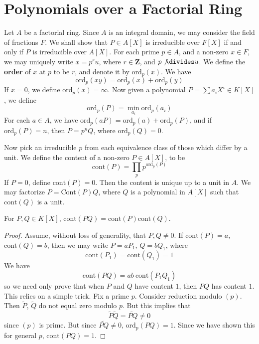 \section{Polynomials over a Factorial Ring}

Let $A$ be a factorial ring. Since $A$ is an integral domain, we may consider the field of fractions $F$. We shall show that $P \in A[X]$ is irreducible over $F[X]$ if and only if $P$ is irreducible over $A[X]$. For each prime $p \in A$, and a non-zero $x \in F$, we may uniquely write $x = p^r u$, where $r \in \mathbf{Z}$, and $p \not \divides u$. We define the {\bf order} of $x$ at $p$ to be $r$, and denote it by $\text{ord}_p(x)$. We have
%
\[ \text{ord}_p(xy) = \text{ord}_p(x) + \text{ord}_p(y) \]
%
If $x = 0$, we define $\text{ord}_p(x) = \infty$. Now given a polynomial $P = \sum a_i X^i \in K[X]$, we define
%
\[ \text{ord}_p(P) = \min_{a_i} \text{ord}_p(a_i) \]
%
For each $a \in A$, we have $\text{ord}_p(aP) = \text{ord}_p(a) + \text{ord}_p(P)$, and if $\text{ord}_p(P) = n$, then $P = p^n Q$, where $\text{ord}_p(Q) = 0$.

Now pick an irreducible $p$ from each equivalence class of those which differ by a unit. We define the content of a non-zero $P \in A[X]$, to be
%
\[ \text{cont}(P) = \prod_p p^{\text{ord}_p(P)} \]
%
If $P = 0$, define $\text{cont}(P) = 0$. Then the content is unique up to a unit in $A$. We may factorize $P = \text{Cont}(P)Q$, where $Q$ is a polynomial in $A[X]$ such that $\text{cont}(Q)$ is a unit.

\begin{lemma}[Gauss]
    For $P,Q \in K[X]$, $\text{cont}(PQ) = \text{cont}(P) \text{cont}(Q)$.
\end{lemma}
\begin{proof}
    Assume, without loss of generality, that $P, Q \neq 0$. If $\text{cont}(P) = a$, $\text{cont}(Q) = b$, then we may write $P = a P_1$, $Q = b Q_1$, where
    \[ \text{cont}(P_1) = \text{cont}(Q_1) = 1 \]
    We have
    \[ \text{cont}(PQ) = ab\ \text{cont}(P_1 Q_1) \]
    so we need only prove that when $P$ and $Q$ have content $1$, then $PQ$ has content $1$. This relies on a simple trick. Fix a prime $p$. Consider reduction modulo $(p)$. Then $\tilde{P}$, $\tilde{Q}$ do not equal zero modulo $p$. But this implies that
    \[ \widetilde{P} \widetilde{Q} = \widetilde{PQ} \neq 0 \]
    since $(p)$ is prime. But since $\widetilde{PQ} \neq 0$, $\text{ord}_p(PQ) = 1$. Since we have shown this for general $p$, $\text{cont}(PQ) = 1$.
\end{proof}

